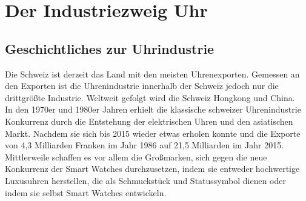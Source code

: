 \clearpage
\chapter{Der Industriezweig Uhr}
\section{Geschichtliches zur Uhrindustrie}
Die Schweiz ist derzeit das Land mit den meisten Uhrenexporten. Gemessen an den Exporten ist die Uhrenindustrie innerhalb der Schweiz jedoch nur die drittgrößte Industrie. Weltweit gefolgt wird die Schweiz Hongkong und China.\\ 
In den 1970er und 1980er Jahren erhielt die klassische schweizer Uhrenindustrie Konkurrenz durch die Entstehung der elektrischen Uhren und den asiatischen Markt. Nachdem sie sich bis 2015 wieder etwas erholen konnte und die Exporte von 4,3 Milliarden Franken im Jahr 1986 auf 21,5 Milliarden im Jahr 2015.\\ 
Mittlerweile schaffen es vor allem die Großmarken, sich gegen die neue Konkurrenz der Smart Watches durchzusetzen, indem sie entweder hochwertige Luxusuhren herstellen, die als Schmuckstück und Statussymbol dienen oder indem sie selbst Smart Watches entwickeln.

